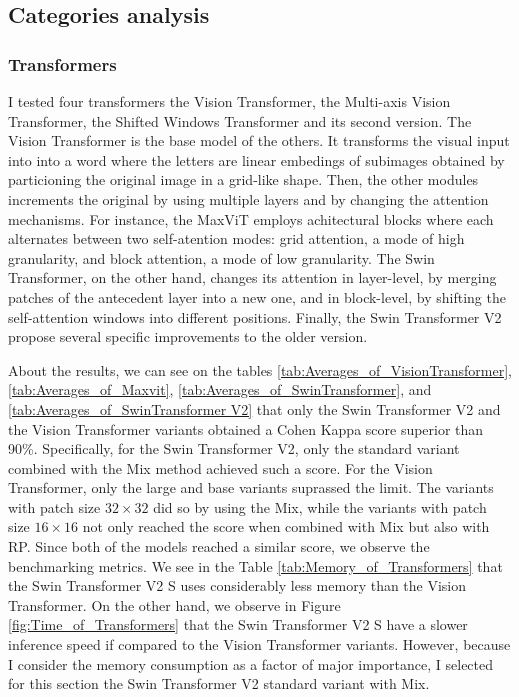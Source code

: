 \subsection{Categories analysis}

\subsubsection{Transformers}

I tested four transformers the Vision Transformer, the Multi-axis Vision Transformer, the Shifted Windows Transformer and its second version. The Vision Transformer is the base model of the others. It transforms the visual input into into a word where the letters are linear embedings of subimages obtained by particioning the original image in a grid-like shape. Then, the other modules increments the original by using multiple layers and by changing the attention mechanisms. For instance, the MaxViT employs achitectural blocks where each alternates between two self-atention modes: grid attention, a mode of high granularity, and block attention, a mode of low granularity. The Swin Transformer, on the other hand, changes its attention in layer-level, by merging patches of the antecedent layer into a new one, and in block-level, by shifting the self-attention windows into different positions. Finally, the Swin Transformer V2 propose several specific improvements to the older version.

About the results, we can see on the tables \ref{tab:Averages_of_VisionTransformer}, \ref{tab:Averages_of_Maxvit}, \ref{tab:Averages_of_SwinTransformer}, and \ref{tab:Averages_of_SwinTransformer V2} that only the Swin Transformer V2 and the Vision Transformer variants obtained a Cohen Kappa score superior than 90\%. Specifically, for the Swin Transformer V2, only the standard variant combined with the \gls{Mix} method achieved such a score. For the Vision Transformer, only the large and base variants suprassed the limit. The variants with patch size $32\times 32$ did so by using the \gls{Mix}, while the variants with patch size $16 \times 16$ not only reached the score when combined with \gls{Mix} but also with \gls{RP}. Since both of the models reached a similar score, we observe the benchmarking metrics. We see in the Table \ref{tab:Memory_of_Transformers} that the Swin Transformer V2 S uses considerably less memory than the Vision Transformer. On the other hand, we observe in Figure \ref{fig:Time_of_Transformers} that the Swin Transformer V2 S have a slower inference speed if compared to the Vision Transformer variants. However, because I consider the memory consumption as a factor of major importance, I selected for this section the Swin Transformer V2 standard variant with \gls{Mix}.

